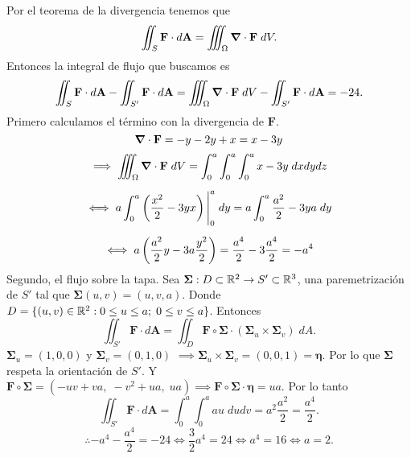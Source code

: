 \begin{solution}
  Por el teorema de la divergencia tenemos que
  \[
    \iint_S \mathbf{F}\cdot d\mathbf{A}=\iiint_\Omega \grad \cdot \mathbf{F}\;dV.
  \]
  Entonces la integral de flujo que buscamos es
  \[
    \iint_S \mathbf{F}\cdot d\mathbf{A} - \iint_{S'} \mathbf{F}\cdot d\mathbf{A}=
    \iiint_\Omega \grad \cdot \mathbf{F}\;dV - \iint_{S'} \mathbf{F}\cdot d\mathbf{A}=-24.
  \]
  Primero calculamos el t\'ermino con la divergencia de $\mathbf{F}$.
  \[
    \grad\cdot\mathbf{F}=-y-2y+x=x-3y
  \]
  \begin{gather*}
    \implies\iiint_\Omega\grad\cdot\mathbf{F}\;dV=\int_0^a \int_0^a \int_0^a x-3y\;dxdydz\\[.2cm]
    \iff a\int_0^a \left(\frac{x^2}{2}-3yx\right)\Bigg|_0^a\;dy=a\int_0^a \frac{a^2}{2}-3ya\;dy\\[.2cm]
    \iff a\left( \frac{a^2}{2}y-3a\frac{y^2}{2} \right)=\frac{a^4}{2}-3\frac{a^4}{2}=-a^4
  \end{gather*}
  Segundo, el flujo sobre la tapa. Sea $\boldsymbol{\Sigma} : D\subset\mathbb{R}^2\to S'\subset\mathbb{R}^3$, una paremetrizaci\'on de $S'$ tal que $\boldsymbol{\Sigma}(u,v)=(u,v,a)$. Donde $D = \{(u,v)\in\mathbb{R}^2:0\leq u\leq a;\;0\leq v \leq a\}$. Entonces
  \[
    \iint_{S'} \mathbf{F}\cdot d\mathbf{A}=\iint_D \mathbf{F}\circ\boldsymbol{\Sigma} \cdot (\boldsymbol{\Sigma}_u\times\boldsymbol{\Sigma}_v)\;dA.
  \]
  $\boldsymbol{\Sigma}_u=(1,0,0)$ y $\boldsymbol{\Sigma}_v=(0,1,0)$ $\implies \boldsymbol{\Sigma}_u\times\boldsymbol{\Sigma}_v=(0,0,1)=\boldsymbol{\eta}$. Por lo que $\boldsymbol{\Sigma}$ respeta la orientaci\'on de $S'$. Y $\mathbf{F}\circ\boldsymbol{\Sigma}=(-uv+va,\;-v^2+ua,\;ua) \implies \mathbf{F}\circ\boldsymbol{\Sigma}\cdot\boldsymbol{\eta}=ua$. Por lo tanto
  \[
    \iint_{S'} \mathbf{F}\cdot d\mathbf{A}=\int_0^a\int_0^a au\;dudv=a^2\frac{a^2}{2}=\frac{a^4}{2}.
  \]
  \[
    \therefore -a^4-\frac{a^4}{2}=-24\iff \frac{3}{2}a^4=24\iff a^4=16 \iff a=2.
  \]

\end{solution}


